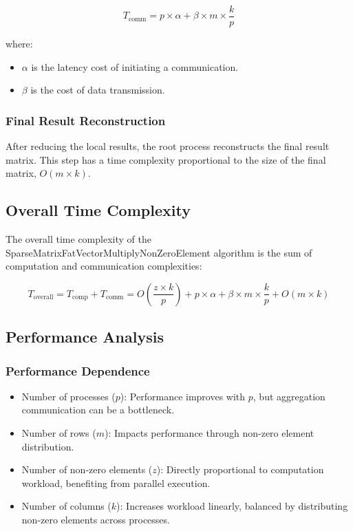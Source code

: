 \documentclass[12pt,oneside]{book} %
\begin{document}
\begin{equation}
    T_{\text{comm}} = p \times \alpha + \beta \times m \times \frac{k}{p}
\end{equation}

where:
\begin{itemize}
    \item \(\alpha\) is the latency cost of initiating a communication.
    \item \(\beta\) is the cost of data transmission.
\end{itemize}

\subsubsection{Final Result Reconstruction}
After reducing the local results, the root process reconstructs the final
result matrix. This step has a time complexity proportional to the size of the
final matrix, \(O(m \times k)\).

\subsection{Overall Time Complexity}
The overall time complexity of the SparseMatrixFatVectorMultiplyNonZeroElement
algorithm is the sum of computation and communication complexities:

\begin{equation}
    T_{\text{overall}} = T_{\text{comp}} + T_{\text{comm}} = O\left(\frac{z \times k}{p}\right) + p \times \alpha + \beta \times m \times \frac{k}{p} + O(m \times k)
\end{equation}

\subsection{Performance Analysis}
\subsubsection{Performance Dependence}
\begin{itemize}
    \item Number of processes ($p$): Performance improves with $p$, but aggregation
          communication can be a bottleneck.
    \item Number of rows ($m$): Impacts performance through non-zero element
          distribution.
    \item Number of non-zero elements ($z$): Directly proportional to computation
          workload, benefiting from parallel execution.
    \item Number of columns ($k$): Increases workload linearly, balanced by distributing
          non-zero elements across processes.
\end{itemize}
\end{document}
